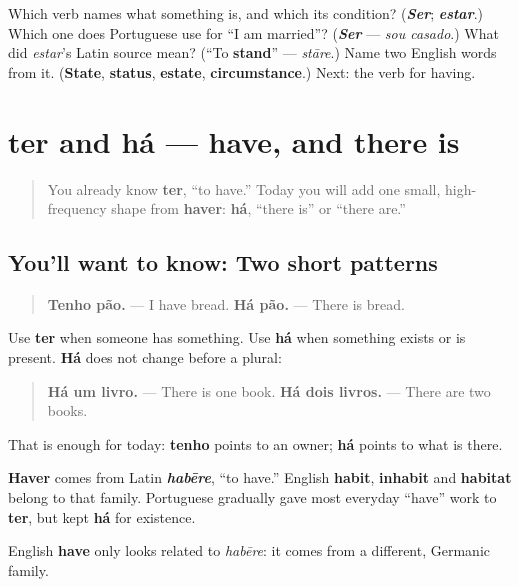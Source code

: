 \begin{tcolorbox}[breakable,colback=teal!4,colframe=teal!35!black,title={Before you move on}]
Which verb names what something is, and which its condition? (\emph{\textbf{Ser}}; \emph{\textbf{estar}}.) Which one does Portuguese use for \textquotedblleft{}I am married\textquotedblright{}? (\emph{\textbf{Ser}} — \emph{sou casado}.) What did \emph{estar}'s Latin source mean? (\textquotedblleft{}To \textbf{stand}\textquotedblright{} — \emph{stāre}.) Name two English words from it. (\textbf{State}, \textbf{status}, \textbf{estate}, \textbf{circumstance}.) Next: the verb for having.
\end{tcolorbox}
\section[ter / haver]{ter and há — have, and there is}

\label{lesson:PT-C18-ter-haver}



\begin{quote}
You already know \textbf{ter}, “to have.” Today you will add one small, high-frequency shape from \textbf{haver}: \textbf{há}, “there is” or “there are.”
\end{quote}

\subsection*{You'll want to know: Two short patterns}
\begin{quote}
\textbf{Tenho pão.} — I have bread. \textbf{Há pão.} — There is bread.
\end{quote}

Use \textbf{ter} when someone has something. Use \textbf{há} when something exists or is present. \textbf{Há} does not change before a plural:

\begin{quote}
\textbf{Há um livro.} — There is one book. \textbf{Há dois livros.} — There are two books.
\end{quote}

That is enough for today: \textbf{tenho} points to an owner; \textbf{há} points to what is there.

\begin{cousinweb}
\textbf{Haver} comes from Latin \emph{\textbf{habēre}}, “to have.” English \textbf{habit}, \textbf{inhabit} and \textbf{habitat} belong to that family. Portuguese gradually gave most everyday “have” work to \textbf{ter}, but kept \textbf{há} for existence.

English \textbf{have} only looks related to \emph{habēre}: it comes from a different, Germanic family.
\end{cousinweb}

